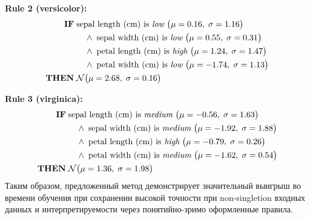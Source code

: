 \noindent\textbf{Rule 2 (versicolor):}  
\begin{align*}
  \textbf{IF}\;&\text{sepal length (cm) is \emph{low}}   \;\bigl(\mu=0.16,\;\sigma=1.16\bigr)\\
                &\quad\land\;\text{sepal width  (cm) is \emph{low}}   \;\bigl(\mu=0.55,\;\sigma=0.31\bigr)\\
                &\quad\land\;\text{petal length (cm) is \emph{high}}  \;\bigl(\mu=1.24,\;\sigma=1.47\bigr)\\
                &\quad\land\;\text{petal width  (cm) is \emph{low}}   \;\bigl(\mu=-1.74,\;\sigma=1.13\bigr)\\
  \textbf{THEN}\;&\mathcal{N}\bigl(\mu=2.68,\;\sigma=0.16\bigr)
\end{align*}

\noindent\textbf{Rule 3 (virginica):}  
\begin{align*}
  \textbf{IF}\;&\text{sepal length (cm) is \emph{medium}}\;\bigl(\mu=-0.56,\;\sigma=1.63\bigr)\\
                &\quad\land\;\text{sepal width  (cm) is \emph{medium}}\;\bigl(\mu=-1.92,\;\sigma=1.88\bigr)\\
                &\quad\land\;\text{petal length (cm) is \emph{high}}  \;\bigl(\mu=-0.79,\;\sigma=0.26\bigr)\\
                &\quad\land\;\text{petal width  (cm) is \emph{medium}}\;\bigl(\mu=-1.62,\;\sigma=0.54\bigr)\\
  \textbf{THEN}\;&\mathcal{N}\bigl(\mu=1.36,\;\sigma=1.98\bigr)
\end{align*}
Таким образом, предложенный метод демонстрирует значительный выигрыш во времени обучения при сохранении высокой точности при non-singletion входных данных и интерпретируемости через понятийно-зримо оформленные правила.
